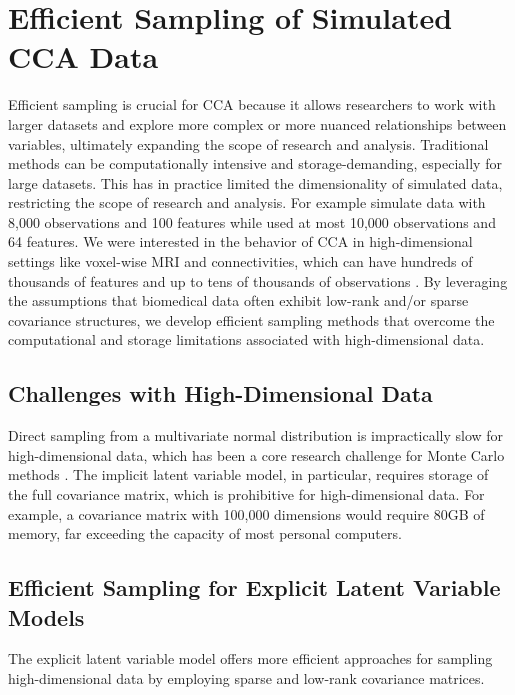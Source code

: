 \section{Efficient Sampling of Simulated CCA Data}\label{sec:efficient}

Efficient sampling is crucial for CCA because it allows researchers to work with larger datasets and explore more complex or more nuanced relationships between variables, ultimately expanding the scope of research and analysis. Traditional methods can be computationally intensive and storage-demanding, especially for large datasets.
This has in practice limited the dimensionality of simulated data, restricting the scope of research and analysis.
For example \citet{matkovic2023contribution} simulate data with 8,000 observations and 100 features while \citet{helmer2020stability} used at most 10,000 observations and 64 features.
We were interested in the behavior of CCA in high-dimensional settings like voxel-wise MRI and connectivities, which can have hundreds of thousands of features \citep{jack2008alzheimer} and up to tens of thousands of observations \citep{sudlow2015uk}.
By leveraging the assumptions that biomedical data often exhibit low-rank and/or sparse covariance structures, we develop efficient sampling methods that overcome the computational and storage limitations associated with high-dimensional data.

\subsection{Challenges with High-Dimensional Data}
Direct sampling from a multivariate normal distribution is impractically slow for high-dimensional data, which has been a core research challenge for Monte Carlo methods \citep{mackay1998introduction}. The implicit latent variable model, in particular, requires storage of the full covariance matrix, which is prohibitive for high-dimensional data. For example, a covariance matrix with 100,000 dimensions would require 80GB of memory, far exceeding the capacity of most personal computers.

\subsection{Efficient Sampling for Explicit Latent Variable Models}
The explicit latent variable model offers more efficient approaches for sampling high-dimensional data by employing sparse and low-rank covariance matrices.

